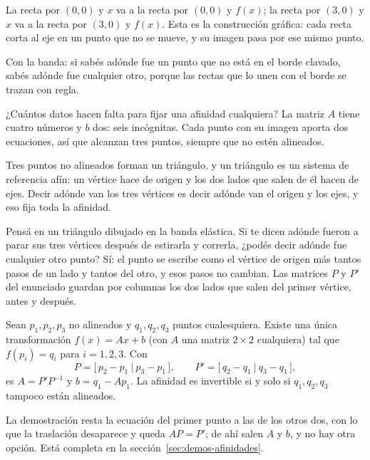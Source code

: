 La recta por \((0,0)\) y \(x\) va a la recta por \((0,0)\) y \(f(x)\); la recta por \((3,0)\) y
\(x\) va a la recta por \((3,0)\) y \(f(x)\). Esta es la construcción gráfica: cada recta corta
al eje en un punto que no se mueve, y su imagen pasa por ese mismo punto.

Con la banda: si sabés adónde fue un punto que no está en el borde clavado, sabés adónde fue
cualquier otro, porque las rectas que lo unen con el borde se trazan con regla.

¿Cuántos datos hacen falta para fijar una afinidad cualquiera? La matriz \(A\) tiene cuatro
números y \(b\) dos: seis incógnitas. Cada punto con su imagen aporta dos ecuaciones, así que
alcanzan tres puntos, siempre que no estén alineados.

\begin{idea}
Tres puntos no alineados forman un triángulo, y un triángulo es un sistema de referencia
afín: un vértice hace de origen y los dos lados que salen de él hacen de ejes. Decir adónde
van los tres vértices es decir adónde van el origen y los ejes, y eso fija toda la
afinidad.
\end{idea}

Pensá en un triángulo dibujado en la banda elástica. Si te dicen adónde fueron a parar sus tres
vértices después de estirarla y correrla, ¿podés decir adónde fue cualquier otro punto? Sí: el
punto se escribe como el vértice de origen más tantos pasos de un lado y tantos del otro, y esos
pasos no cambian. Las matrices \(P\) y \(P'\) del enunciado guardan por columnas los dos lados
que salen del primer vértice, antes y después.

\begin{proposicion}\label{prop:06-tres-puntos}
Sean \(p_1,p_2,p_3\) no alineados y \(q_1,q_2,q_3\) puntos cualesquiera. Existe una única
transformación \(f(x)=Ax+b\) (con \(A\) una matriz \(2\times2\) cualquiera) tal que
\(f(p_i)=q_i\) para \(i=1,2,3\). Con
\[
  P=\bigl[\,p_2-p_1\ \big|\ p_3-p_1\,\bigr],
  \qquad
  P'=\bigl[\,q_2-q_1\ \big|\ q_3-q_1\,\bigr],
\]
es \(A=P'P^{-1}\) y \(b=q_1-Ap_1\). La afinidad es invertible si y solo si \(q_1,q_2,q_3\)
tampoco están alineados.
\end{proposicion}

La demostración resta la ecuación del primer punto a las de los otros dos, con lo que la
traslación desaparece y queda \(AP=P'\); de ahí salen \(A\) y \(b\), y no hay otra opción. Está
completa en la sección~\ref{sec:demos-afinidades}.

